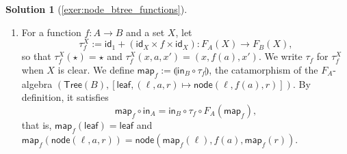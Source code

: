 \documentclass[a4paper,11pt, oneside,titlepage=false]{scrbook}
\theoremstyle{plain}
\theoremstyle{definition}
\newtheorem{solution}[thm]{Solution}
\newcommand{\cfont}[1]{\ensuremath{\mathsf{#1}}}
\newcommand{\Id}[1][]{\cfont{id}_{#1}}
\newcommand{\catam}[1]{\llparenthesis #1 \rrparenthesis}
\newcommand{\In}{\ensuremath{\mathsf{in}}}
\begin{document}
\begin{solution}[\cref{exer:node_btree_functions}]
\begin{enumerate}
  \item For a function $f : A \to B$ and a set $X$, let
    \[ \tau^X_f := \Id[1] + (\Id[X] \times f \times \Id[X]) : F_A(X) \to F_B(X), \]
    so that $\tau^X_f(\star) = \star$ and $\tau^X_f(x, a, x') = (x, f(a), x')$.
    We write $\tau_f$ for $\tau^X_f$ when $X$ is clear.
    We define $\mathsf{map}_f := \catam{\In_B \circ \tau_f}$, the catamorphism of the $F_A$-algebra $(\mathsf{Tree}(B), [\mathsf{leaf}, (\ell, a, r) \mapsto \mathsf{node}(\ell, f(a), r)])$.
    By definition, it satisfies
    \begin{equation}\label{eq:tree-map}
      \mathsf{map}_f \circ \In_A = \In_B \circ \tau_f \circ F_A(\mathsf{map}_f),
    \end{equation}
    that is, $\mathsf{map}_f(\mathsf{leaf}) = \mathsf{leaf}$ and $\mathsf{map}_f(\mathsf{node}(\ell, a, r)) = \mathsf{node}(\mathsf{map}_f(\ell), f(a), \mathsf{map}_f(r))$.


\end{enumerate}
\end{solution}
\end{document}
